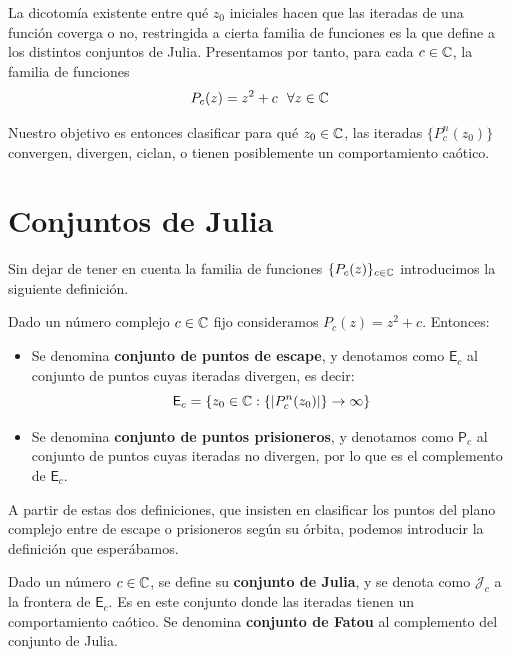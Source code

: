 La dicotomía existente entre qué $z_0$ iniciales hacen que las iteradas de una función coverga o no, restringida a cierta familia de funciones es la que define a los distintos conjuntos de Julia. Presentamos por tanto, para cada $c\in\mathbb{C}$, la familia de funciones
\begin{equation}
  P_c(z) = z^2 +c \ \ \forall z\in\mathbb{C}
\end{equation}

Nuestro objetivo es entonces clasificar para qué $z_0\in\mathbb{C}$, las iteradas $\{P_c^n(z_0)\}$ convergen, divergen, ciclan, o tienen posiblemente un comportamiento caótico.

\section{Conjuntos de Julia}
\label{section:Julia}

Sin dejar de tener en cuenta la familia de funciones $\{P_c(z)\}_{c\in\mathbb{C}}$ introducimos la siguiente definición.

\begin{definicion}
  Dado un número complejo $c\in\mathbb{C}$ fijo consideramos $P_c(z)=z^2+c$. Entonces:
  \begin{itemize}
    \item Se denomina \textbf{conjunto de puntos de escape}, y denotamos como $\mathsf{E}_c$ al conjunto de puntos cuyas iteradas divergen, es decir:
    $$
    \mathsf{E}_c = \{z_0\in\mathbb{C}: \{|P_c^n(z_0)|\}\rightarrow \infty \}
    $$
    \item  Se denomina \textbf{conjunto de puntos prisioneros}, y denotamos como $\mathsf{P}_c$ al conjunto de puntos cuyas iteradas no divergen, por lo que es el complemento de $\mathsf{E}_c$.
  \end{itemize}
\end{definicion}

A partir de estas dos definiciones, que insisten en clasificar los puntos del plano complejo entre de escape o prisioneros según su órbita, podemos introducir la definición que esperábamos.

\begin{definicion}
Dado un número $c\in\mathbb{C}$, se define su \textbf{conjunto de Julia}, y se denota como $\mathcal{J}_c$ a la frontera de $\mathsf{E}_c$. Es en este conjunto donde las iteradas tienen un comportamiento caótico. Se denomina \textbf{conjunto de Fatou} al complemento del conjunto de Julia.
\end{definicion}



